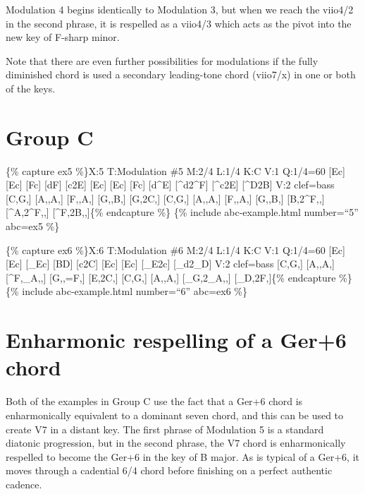 \documentclass{book}
\begin{document}
Modulation 4 begins identically to Modulation 3, but when we reach the viio4/2
in the second phrase, it is respelled as a viio4/3 which acts as the pivot
into the new key of F-sharp minor.

Note that there are even further possibilities for modulations if the fully
diminished chord is used a secondary leading-tone chord (viio7/x) in one or
both of the keys.

\hypertarget{group-c}{%
\section{Group C}\label{group-c}}

\{\% capture ex5 \%\}X:5 T:Modulation \#5 M:2/4 L:1/4 K:C V:1 Q:1/4=60
{[}Ec{]} {[}Ec{]}\textbar{} {[}Fc{]} {[}dF{]}\textbar{} {[}c2E{]}\textbar{}
{[}Ec{]} {[}Ec{]}\textbar{} {[}Fc{]} {[}d\^{}E{]}\textbar{}
{[}\^{}d2\^{}F{]}\textbar{} {[}\^{}c2E{]}\textbar{} {[}\^{}D2B{]}\textbar{]}
V:2 clef=bass {[}C,G,{]} {[}A,,A,{]}\textbar{} {[}F,,A,{]}
{[}G,,B,{]}\textbar{} {[}G,2C,{]}\textbar{} {[}C,G,{]} {[}A,,A,{]}\textbar{}
{[}F,,A,{]} {[}G,,B,{]}\textbar{} {[}B,2\^{}F,,{]}\textbar{}
{[}\^{}A,2\^{}F,,{]}\textbar{} {[}\^{}F,2B,,{]}\textbar{]}\{\% endcapture \%\}
\{\% include abc-example.html number=``5'' abc=ex5 \%\}

\{\% capture ex6 \%\}X:6 T:Modulation \#6 M:2/4 L:1/4 K:C V:1 Q:1/4=60
{[}Ec{]} {[}Ec{]}\textbar{} {[}\_Ec{]} {[}BD{]}\textbar{} {[}c2C{]}\textbar{}
{[}Ec{]} {[}Ec{]}\textbar{} {[}\_E2c{]}\textbar{} {[}\_d2\_D{]}\textbar{]} V:2
clef=bass {[}C,G,{]} {[}A,,A,{]}\textbar{} {[}\^{}F,\_A,,{]}
{[}G,,=F,{]}\textbar{} {[}E,2C,{]}\textbar{} {[}C,G,{]} {[}A,,A,{]}\textbar{}
{[}\_G,2\_A,,{]}\textbar{} {[}\_D,2F,{]}\textbar{]}\{\% endcapture \%\} \{\%
include abc-example.html number=``6'' abc=ex6 \%\}

\hypertarget{enharmonic-respelling-of-a-ger6-chord}{%
\section{Enharmonic respelling of a Ger+6
chord}\label{enharmonic-respelling-of-a-ger6-chord}}

Both of the examples in Group C use the fact that a Ger+6 chord is
enharmonically equivalent to a dominant seven chord, and this can be used to
create V7 in a distant key. The first phrase of Modulation 5 is a standard
diatonic progression, but in the second phrase, the V7 chord is enharmonically
respelled to become the Ger+6 in the key of B major. As is typical of a Ger+6,
it moves through a cadential 6/4 chord before finishing on a perfect authentic
cadence.
\end{document}
